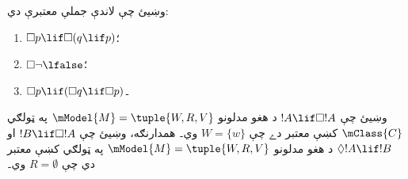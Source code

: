 \documentclass[../../../include/open-logic-section]{subfiles}
\begin{document}
\begin{prob}
  وښيئ چې لاندې جملې معتبرې دي:
  \begin{enumerate}
  \item $\Box p \lif \Box (q \lif p)$؛
  \item $\Box \lnot \lfalse$؛
  \item $\Box p \lif (\Box q \lif \Box p)$۔
  \end{enumerate}
\end{prob}

\begin{prob}
  وښيئ چې $!A \lif \Box!A$ د هغو مدلونو $\mModel{M} = \tuple{W, R, V}$
  په ټولګي $\mClass{C}$ کښې معتبر دے چې $W = \{w\}$ وي۔ همدارنګه،
  وښيئ چې $!B \lif \Box !A$ او $\Diamond !A \lif !B$ د هغو مدلونو
  $\mModel{M} = \tuple{W, R, V}$ په ټولګي کښې معتبر دي چې
  $R = \emptyset$ وي۔
\end{prob}
\end{document}
